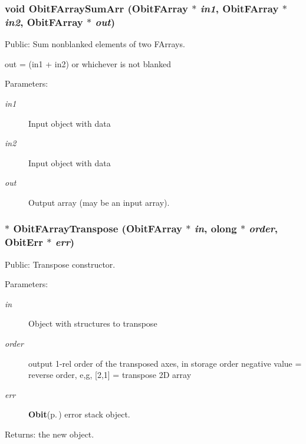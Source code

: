 \subsubsection{\setlength{\rightskip}{0pt plus 5cm}void Obit\-FArray\-Sum\-Arr ({\bf Obit\-FArray} $\ast$ {\em in1}, {\bf Obit\-FArray} $\ast$ {\em in2}, {\bf Obit\-FArray} $\ast$ {\em out})}\label{ObitFArray_8c_a50}


Public: Sum nonblanked elements of two FArrays. 

out = (in1 + in2) or whichever is not blanked \begin{Desc}
\item[Parameters:]
\begin{description}
\item[{\em in1}]Input object with data \item[{\em in2}]Input object with data \item[{\em out}]Output array (may be an input array). \end{description}
\end{Desc}
\subsubsection{$\ast$ Obit\-FArray\-Transpose ({\bf Obit\-FArray} $\ast$ {\em in}, {\bf olong} $\ast$ {\em order}, {\bf Obit\-Err} $\ast$ {\em err})}\label{ObitFArray_8c_a21}


Public: Transpose constructor. 

\begin{Desc}
\item[Parameters:]
\begin{description}
\item[{\em in}]Object with structures to transpose \item[{\em order}]output 1-rel order of the transposed axes, in storage order negative value = reverse order, e,g, [2,1] = transpose 2D array \item[{\em err}]{\bf Obit}{\rm (p.\,\pageref{structObit})} error stack object. \end{description}
\end{Desc}
\begin{Desc}
\item[Returns:]the new object. \end{Desc}
